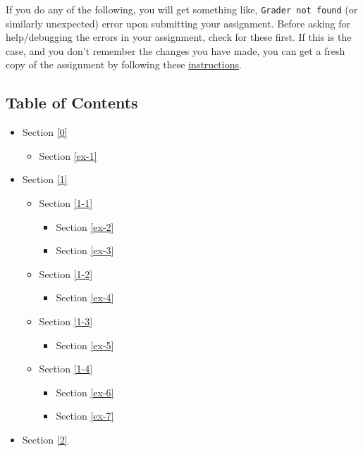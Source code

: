 \documentclass[11pt]{article}
\providecommand{\tightlist}{%
      \setlength{\itemsep}{0pt}\setlength{\parskip}{0pt}}
\begin{document}
If you do any of the following, you will get something like,
\texttt{Grader\ not\ found} (or similarly unexpected) error upon
submitting your assignment. Before asking for help/debugging the errors
in your assignment, check for these first. If this is the case, and you
don't remember the changes you have made, you can get a fresh copy of
the assignment by following these
\href{https://www.coursera.org/learn/neural-networks-deep-learning/supplement/iLwon/h-ow-to-refresh-your-workspace}{instructions}.

    \hypertarget{table-of-contents}{%
\subsection{Table of Contents}\label{table-of-contents}}

\begin{itemize}
\tightlist
\item
  Section \ref{0}

  \begin{itemize}
  \tightlist
  \item
    Section \ref{ex-1}
  \end{itemize}
\item
  Section \ref{1}

  \begin{itemize}
  \tightlist
  \item
    Section \ref{1-1}

    \begin{itemize}
    \tightlist
    \item
      Section \ref{ex-2}
    \item
      Section \ref{ex-3}
    \end{itemize}
  \item
    Section \ref{1-2}

    \begin{itemize}
    \tightlist
    \item
      Section \ref{ex-4}
    \end{itemize}
  \item
    Section \ref{1-3}

    \begin{itemize}
    \tightlist
    \item
      Section \ref{ex-5}
    \end{itemize}
  \item
    Section \ref{1-4}

    \begin{itemize}
    \tightlist
    \item
      Section \ref{ex-6}
    \item
      Section \ref{ex-7}
    \end{itemize}
  \end{itemize}
\item
  Section \ref{2}


\end{itemize}
\end{document}
